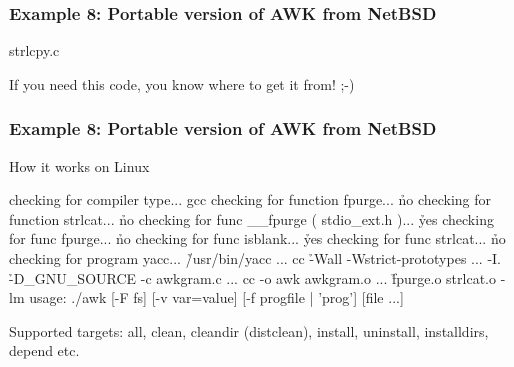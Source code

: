 \documentclass[hyperref={colorlinks=true}]{beamer}
\begin{document}
\begin{frame}[fragile]
  \frametitle{Example 8: Portable version of AWK from NetBSD}

\begin{block}{strlcpy.c}
\begin{CodeNoLabel}
If you need this code, you know where to get it from! ;-)
\end{CodeNoLabel}
\end{block}
\end{frame}

\begin{frame}[fragile]
  \frametitle{Example 8: Portable version of AWK from NetBSD}

\begin{block}{How it works on Linux}
\begin{CodeNoLabel}
checking for compiler type... gcc
checking for function fpurge... \h{no}
checking for function strlcat... \h{no}
checking for func __fpurge ( stdio_ext.h )... \h{yes}
checking for func fpurge... \h{no}
checking for func isblank... \h{yes}
checking for func strlcat... \h{no}
checking for program yacc... \h{/usr/bin/yacc}
...
cc \h{-Wall -Wstrict-prototypes ...} 
    -I. \h{-D\_GNU\_SOURCE} -c awkgram.c
...
cc -o awk awkgram.o ... \h{fpurge.o strlcat.o} -lm
usage: ./awk [-F fs] [-v var=value] [-f progfile 
    | 'prog'] [file ...]
\prompt{\$}
\end{CodeNoLabel}
\end{block}
Supported targets: all, clean, cleandir (distclean), install,
uninstall, installdirs, depend etc.
\end{frame}
\end{document}
